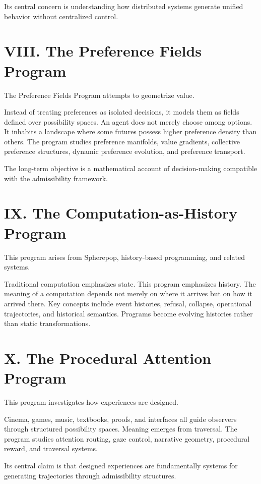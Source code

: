 \documentclass[12pt, openany]{book}
\begin{document}
Its central concern is understanding how distributed systems generate unified
behavior without centralized control.

\section{VIII. The Preference Fields Program}

The Preference Fields Program attempts to geometrize value.

Instead of treating preferences as isolated decisions, it models them as
fields defined over possibility spaces. An agent does not merely choose among
options. It inhabits a landscape where some futures possess higher preference
density than others. The program studies preference manifolds, value
gradients, collective preference structures, dynamic preference evolution,
and preference transport.

The long-term objective is a mathematical account of decision-making
compatible with the admissibility framework.

\section{IX. The Computation-as-History Program}

This program arises from Spherepop, history-based programming, and related
systems.

Traditional computation emphasizes state. This program emphasizes history.
The meaning of a computation depends not merely on where it arrives but on
how it arrived there. Key concepts include event histories, refusal,
collapse, operational trajectories, and historical semantics. Programs become
evolving histories rather than static transformations.

\section{X. The Procedural Attention Program}

This program investigates how experiences are designed.

Cinema, games, music, textbooks, proofs, and interfaces all guide observers
through structured possibility spaces. Meaning emerges from traversal. The
program studies attention routing, gaze control, narrative geometry,
procedural reward, and traversal systems.

Its central claim is that designed experiences are fundamentally systems for
generating trajectories through admissibility structures.
\end{document}
